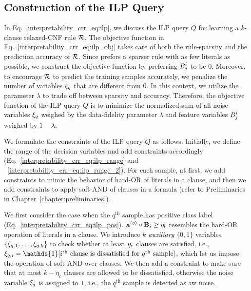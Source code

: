 \subsection{Construction of the ILP Query}
\label{interpretability_crr_sec:ilp_query}
In Eq.~\eqref{interpretability_crr_eq:ilp}, we discuss the ILP query $ Q $  for learning  a $ k $-clause relaxed-CNF rule  $ {\mathcal{R}} $. The objective function in Eq.~\eqref{interpretability_crr_eq:ilp_obj} takes care of  both the rule-sparsity and the prediction accuracy of $ {\mathcal{R}} $. Since {\crr} prefers a sparser rule  with as few literals as possible, we construct the objective function by preferring  $ B^i_j $ to be  $ 0 $. Moreover, to encourage $ {\mathcal{R}} $ to predict  the training samples accurately, we penalize the number of variables $ \xi_q $ that are different from $ 0 $. In this context, we utilize  the   parameter $ \lambda $ to trade off between sparsity and accuracy.  Therefore,  the objective function of the ILP query $ Q $ is to minimize the normalized sum of all  noise variables $ \xi_q $  weighed  by the data-fidelity parameter $ \lambda $ and feature variables $ B^i_j $ weighed by $ 1-\lambda $.

We formulate the constraints of the ILP query $ Q $ as follows. Initially, we define the range of the decision variables and   add constraints accordingly (Eq.~\ref{interpretability_crr_eq:ilp_range} and ~\ref{interpretability_crr_eq:ilp_range_2}).  For each sample, at first, we  add constraints to mimic the behavior of hard-OR of literals in a clause, and then we add constraints to apply  soft-AND of clauses in a formula (refer to Preliminaries in Chapter~\ref{chapter:preliminaries}).

We first consider the case when  the $ q^\text{th} $  sample  has positive class label (Eq.~\ref{interpretability_crr_eq:ilp_pos}). 
$ \mathbf{x}^{(q)}\circ \mathbf{B}_i \ge \eta_l $ resembles the hard-OR operation of literals in a clause.  We introduce   $ k $ \emph{auxiliary} $ \{0, 1\} $ variables $ \{\xi_{q,1}, \dots, \xi_{q,k}\} $  to check whether at least $ \eta_c $ clauses are satisfied, i.e., $ \noise_{q,i}=\mathds{1}[i^\text{th}\text{ clause is dissatisfied for }q^\text{th}\text{ sample}] $, which let us impose the operation of soft-AND over clauses.    We then add a constraint to make sure that at most $ k-\eta_{c} $ clauses are allowed to be dissatisfied, otherwise the noise variable $ \xi_q $  is assigned to $ 1 $, i.e., the $ q^\text{th} $ sample is detected as aw noise.  
 



